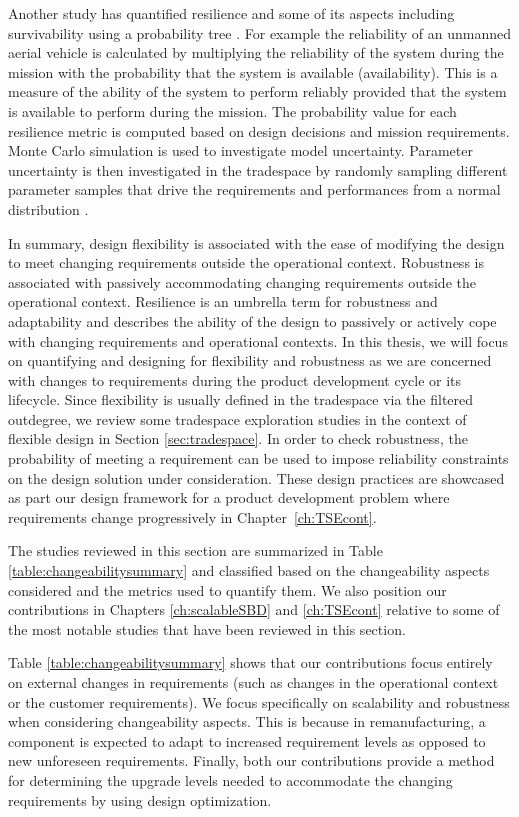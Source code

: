Another study has quantified resilience and some of its aspects including survivability using a probability tree \cite{Small2019}. For example the reliability of an unmanned aerial vehicle is calculated by multiplying the reliability of the system during the mission with the probability that the system is available (availability). This is a measure of the ability of the system to perform reliably provided that the system is available to perform during the mission. The probability value for each resilience metric is computed based on design decisions and mission requirements. Monte Carlo simulation is used to investigate model uncertainty. Parameter uncertainty is then investigated in the tradespace by randomly sampling different parameter samples that drive the requirements and performances from a normal distribution \cite{Small2019}. 

In summary, design flexibility is associated with the ease of modifying the design to meet changing requirements outside the operational context. Robustness is associated with passively accommodating changing requirements outside the operational context. Resilience is an umbrella term for robustness and adaptability and describes the ability of the design to passively or actively cope with changing requirements and operational contexts. In this thesis, we will focus on quantifying and designing for flexibility and robustness as we are concerned with changes to requirements during the product development cycle or its lifecycle. Since flexibility is usually defined in the tradespace via the filtered outdegree, we review some tradespace exploration studies in the context of flexible design in Section \ref{sec:tradespace}. In order to check robustness, the probability of meeting a requirement can be used to impose reliability constraints on the design solution under consideration. These design practices are showcased as part our design framework for a product development problem where requirements change progressively in Chapter~\ref{ch:TSEcont}.

The studies reviewed in this section are summarized in Table \ref{table:changeabilitysummary} and classified based on the changeability aspects considered and the metrics used to quantify them. We also position our contributions in Chapters \ref{ch:scalableSBD} and \ref{ch:TSEcont} relative to some of the most notable studies that have been reviewed in this section.

Table \ref{table:changeabilitysummary} shows that our contributions focus entirely on external changes in requirements (such as changes in the operational context or the customer requirements). We focus specifically on scalability and robustness when considering changeability aspects. This is because in remanufacturing, a component is expected to adapt to increased requirement levels as opposed to new unforeseen requirements. Finally, both our contributions provide a method for determining the upgrade levels needed to accommodate the changing requirements by using design optimization.

